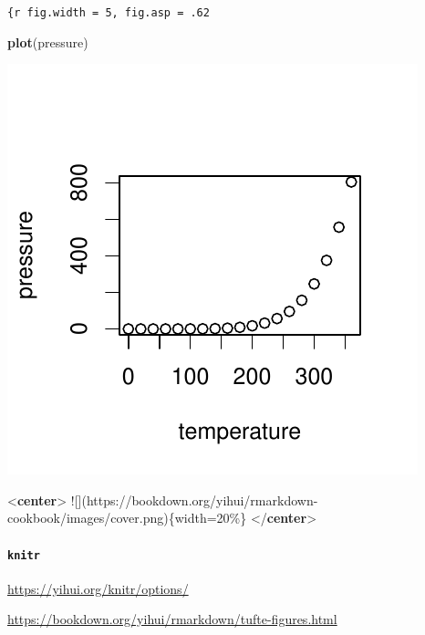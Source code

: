 \documentclass[
]{book}
\newenvironment{Shaded}{\begin{snugshade}}{\end{snugshade}}
\newcommand{\AlertTok}[1]{\textcolor[rgb]{0.94,0.16,0.16}{#1}}
\newcommand{\DataTypeTok}[1]{\textcolor[rgb]{0.13,0.29,0.53}{#1}}
\newcommand{\FunctionTok}[1]{\textcolor[rgb]{0.13,0.29,0.53}{\textbf{#1}}}
\newcommand{\KeywordTok}[1]{\textcolor[rgb]{0.13,0.29,0.53}{\textbf{#1}}}
\newcommand{\NormalTok}[1]{#1}
\theoremstyle{definition}
\theoremstyle{definition}
\theoremstyle{definition}
\theoremstyle{definition}
\theoremstyle{remark}
\begin{document}
\texttt{\{r\ fig.width\ =\ 5,\ fig.asp\ =\ .62}

\begin{Shaded}
\begin{Highlighting}[]
\FunctionTok{plot}\NormalTok{(pressure)}
\end{Highlighting}
\end{Shaded}

\begin{center}\includegraphics{202401280001-test_files/figure-latex/unnamed-chunk-9-1} \end{center}

\begin{Shaded}
\begin{Highlighting}[]
\DataTypeTok{\textless{}}\KeywordTok{center}\DataTypeTok{\textgreater{}}
\AlertTok{![](https://bookdown.org/yihui/rmarkdown{-}cookbook/images/cover.png)}\NormalTok{\{width=20\%\}}
\DataTypeTok{\textless{}/}\KeywordTok{center}\DataTypeTok{\textgreater{}}
\end{Highlighting}
\end{Shaded}

\paragraph{\texorpdfstring{\texttt{knitr}}{knitr}}\label{knitr}

\url{https://yihui.org/knitr/options/}

\url{https://bookdown.org/yihui/rmarkdown/tufte-figures.html}
\end{document}
